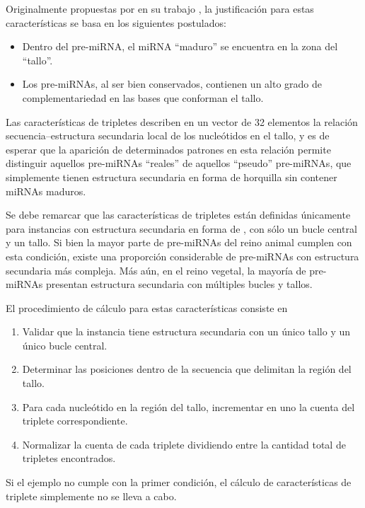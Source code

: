 Originalmente propuestas por \citeauthor{xue} en su trabajo
\cite{xue}, la justificación para estas características se basa en los
siguientes postulados:

\begin{itemize}
\item Dentro del pre-miRNA, el miRNA ``maduro'' se encuentra en la
  zona del ``tallo''.
\item Los pre-miRNAs, al ser bien conservados, contienen un alto grado
  de complementariedad en las bases que conforman el tallo.
\end{itemize}
Las características de tripletes describen en un vector de 32
elementos la relación secuencia--estructura secundaria local de los
nucleótidos en el tallo, y es de esperar que la aparición de
determinados patrones en esta relación permite distinguir aquellos
pre-miRNAs ``reales'' de aquellos ``pseudo'' pre-miRNAs, que
simplemente tienen estructura secundaria en forma de horquilla sin
contener miRNAs maduros.

Se debe remarcar que las características de tripletes están definidas
únicamente para instancias con estructura secundaria en forma de
, con sólo un bucle central y un tallo.  Si bien la mayor
parte de pre-miRNAs del reino animal cumplen con esta condición,
existe una proporción considerable de pre-miRNAs con estructura
secundaria más compleja. Más aún, en el reino vegetal, la mayoría de
pre-miRNAs presentan estructura secundaria con múltiples bucles y
tallos.

El procedimiento de cálculo para estas características consiste en

\begin{enumerate}
\item Validar que la instancia tiene estructura secundaria con un
  único tallo y un único bucle central.
\item Determinar las posiciones dentro de la secuencia que delimitan
  la región del tallo.
\item Para cada nucleótido en la región del tallo, incrementar en uno
  la cuenta del triplete correspondiente.
\item Normalizar la cuenta de cada triplete dividiendo entre la
  cantidad total de tripletes encontrados.
\end{enumerate}
Si el ejemplo no cumple con la primer condición, el cálculo de
características de triplete simplemente no se lleva a cabo.
